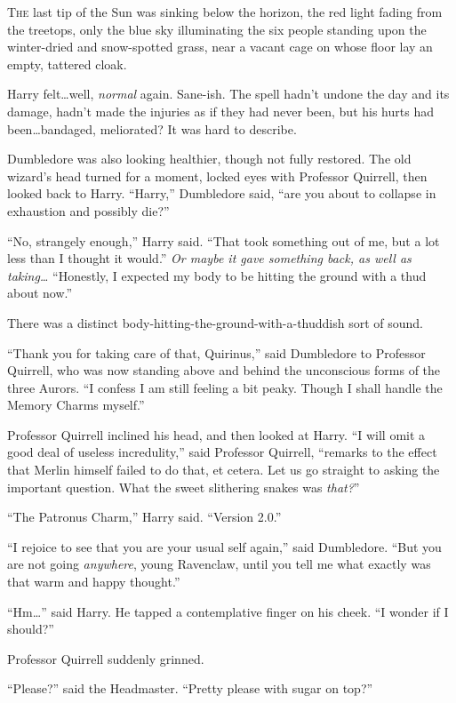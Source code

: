 
\lettrine{T}{he} last tip of the Sun was sinking below the horizon, the red light fading from the treetops, only the blue sky illuminating the six people standing upon the winter-dried and snow-spotted grass, near a vacant cage on whose floor lay an empty, tattered cloak.

Harry felt…well, \emph{normal} again. Sane-ish. The spell hadn’t undone the day and its damage, hadn’t made the injuries as if they had never been, but his hurts had been…bandaged, meliorated? It was hard to describe.

Dumbledore was also looking healthier, though not fully restored. The old wizard’s head turned for a moment, locked eyes with Professor Quirrell, then looked back to Harry. “Harry,” Dumbledore said, “are you about to collapse in exhaustion and possibly die?”

“No, strangely enough,” Harry said. “That took something out of me, but a lot less than I thought it would.” \emph{Or maybe it gave something back, as well as taking…} “Honestly, I expected my body to be hitting the ground with a thud about now.”

There was a distinct body-hitting-the-ground-with-a-thuddish sort of sound.

“Thank you for taking care of that, Quirinus,” said Dumbledore to Professor Quirrell, who was now standing above and behind the unconscious forms of the three Aurors. “I confess I am still feeling a bit peaky. Though I shall handle the Memory Charms myself.”

Professor Quirrell inclined his head, and then looked at Harry. “I will omit a good deal of useless incredulity,” said Professor Quirrell, “remarks to the effect that Merlin himself failed to do that, et cetera. Let us go straight to asking the important question. What the sweet slithering snakes was \emph{that?}”

“The Patronus Charm,” Harry said. “Version 2.0.”

“I rejoice to see that you are your usual self again,” said Dumbledore. “But you are not going \emph{anywhere}, young Ravenclaw, until you tell me what exactly was that warm and happy thought.”

“Hm…” said Harry. He tapped a contemplative finger on his cheek. “I wonder if I should?”

Professor Quirrell suddenly grinned.

“Please?” said the Headmaster. “Pretty please with sugar on top?”

